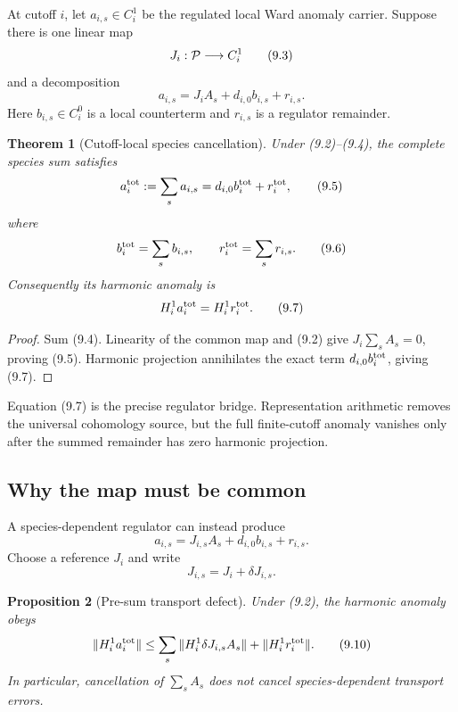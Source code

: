 \documentclass[11pt]{article}
\newtheorem{theorem}{Theorem}[section]
\newtheorem{proposition}[theorem]{Proposition}
\theoremstyle{remark}
\begin{document}
At cutoff \(i\), let \(a_{i,s}\in C_i^1\) be the regulated local Ward
anomaly carrier.  Suppose there is one linear map
\[
                              J_i:{\cal P}\longrightarrow C_i^1
                                                                    \tag{9.3}
\]
and a decomposition
\[
                              a_{i,s}
 =J_iA_s+d_{i,0}b_{i,s}+r_{i,s}.                            \tag{9.4}
\]
Here \(b_{i,s}\in C_i^0\) is a local counterterm and \(r_{i,s}\) is a
regulator remainder.

\begin{theorem}[Cutoff-local species cancellation]
\label{thm:v12v9-common}
Under (9.2)--(9.4), the complete species sum satisfies
\[
                              a_i^{\rm tot}:=\sum_sa_{i,s}
 =d_{i,0}b_i^{\rm tot}+r_i^{\rm tot},                       \tag{9.5}
\]
where
\[
                              b_i^{\rm tot}=\sum_sb_{i,s},
 \qquad
                              r_i^{\rm tot}=\sum_sr_{i,s}.   \tag{9.6}
\]
Consequently its harmonic anomaly is
\[
                              H_i^1a_i^{\rm tot}
                              =H_i^1r_i^{\rm tot}.           \tag{9.7}
\]
\end{theorem}

\begin{proof}
Sum (9.4).  Linearity of the common map and (9.2) give
\(J_i\sum_sA_s=0\), proving (9.5).  Harmonic projection annihilates
the exact term \(d_{i,0}b_i^{\rm tot}\), giving (9.7).
\end{proof}

Equation (9.7) is the precise regulator bridge.  Representation
arithmetic removes the universal cohomology source, but the full
finite-cutoff anomaly vanishes only after the summed remainder has
zero harmonic projection.

\subsection{Why the map must be common}

A species-dependent regulator can instead produce
\[
 a_{i,s}=J_{i,s}A_s+d_{i,0}b_{i,s}+r_{i,s}.                 \tag{9.8}
\]
Choose a reference \(J_i\) and write
\[
                              J_{i,s}=J_i+\delta J_{i,s}.    \tag{9.9}
\]

\begin{proposition}[Pre-sum transport defect]
\label{prop:v12v9-presum}
Under (9.2), the harmonic anomaly obeys
\[
 \|H_i^1a_i^{\rm tot}\|
 \le\sum_s\|H_i^1\delta J_{i,s}A_s\|
       +\|H_i^1r_i^{\rm tot}\|.                             \tag{9.10}
\]
In particular, cancellation of \(\sum_sA_s\) does not cancel
species-dependent transport errors.
\end{proposition}
\end{document}
